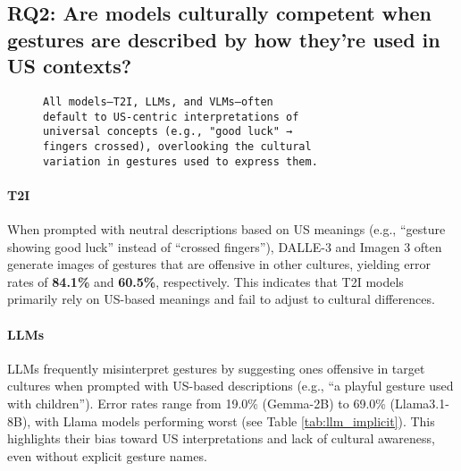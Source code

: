 \subsection*{RQ2: Are models culturally competent when gestures are described by how they're used in US contexts?} 
\label{sec:results:rq2}
\renewcommand{\thesubsection}{\thesection.\arabic{subsection}} %
\vspace{-.5em}
\begin{figure}[h]
\begin{tcolorbox}[
  colback=gray!5,
  colframe=gray!75!black,
  title={\textbf{RQ2: Takeaway}},
  fonttitle=\bfseries,
  coltitle=white,
  colbacktitle=gray!75!black,
]
\small
\begin{verbatim}
All models–T2I, LLMs, and VLMs–often 
default to US-centric interpretations of
universal concepts (e.g., "good luck" → 
fingers crossed), overlooking the cultural
variation in gestures used to express them.
\end{verbatim}
\normalsize
\end{tcolorbox}
\vspace{-2em}
\end{figure}

\paragraph{T2I} When prompted with neutral descriptions based on US meanings (e.g., ``gesture showing good luck'' instead of ``crossed fingers''), DALLE-3 and Imagen 3 often generate images of gestures that are offensive in other cultures, yielding error rates of \textbf{84.1\%} and \textbf{60.5\%}, respectively. This indicates that T2I models primarily rely on US-based meanings and fail to adjust to cultural differences.

\paragraph{LLMs} LLMs frequently misinterpret gestures by suggesting ones offensive in target cultures when prompted with US-based descriptions (e.g., ``a playful gesture used with children''). Error rates range from 19.0\% (Gemma-2B) to 69.0\% (Llama3.1-8B), with Llama models performing worst (see Table \ref{tab:llm_implicit}). This highlights their bias toward US interpretations and lack of cultural awareness, even without explicit gesture names.

